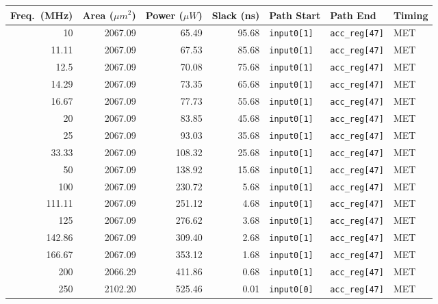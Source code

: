 \documentclass[a4paper,11pt]{article}
\begin{document}
\begin{table}[H]
    \centering
    \scriptsize
    \begin{tabular}{rrrrlll}
        \toprule
        \textbf{Freq.\ (MHz)} &
        \textbf{Area ($\mu m^2$)} &
        \textbf{Power ($\mu W$)} &
        \textbf{Slack (ns)} &
        \textbf{Path Start} &
        \textbf{Path End} &
        \textbf{Timing} \\
        \midrule
        10      & 2067.09 & 65.49   & 95.68  & \texttt{input0[1]}  & \texttt{acc\_reg[47]} & MET \\
        11.11   & 2067.09 & 67.53   & 85.68  & \texttt{input0[1]}  & \texttt{acc\_reg[47]} & MET \\
        12.5    & 2067.09 & 70.08   & 75.68  & \texttt{input0[1]}  & \texttt{acc\_reg[47]} & MET \\
        14.29   & 2067.09 & 73.35   & 65.68  & \texttt{input0[1]}  & \texttt{acc\_reg[47]} & MET \\
        16.67   & 2067.09 & 77.73   & 55.68  & \texttt{input0[1]}  & \texttt{acc\_reg[47]} & MET \\
        20      & 2067.09 & 83.85   & 45.68  & \texttt{input0[1]}  & \texttt{acc\_reg[47]} & MET \\
        25      & 2067.09 & 93.03   & 35.68  & \texttt{input0[1]}  & \texttt{acc\_reg[47]} & MET \\
        33.33   & 2067.09 & 108.32  & 25.68  & \texttt{input0[1]}  & \texttt{acc\_reg[47]} & MET \\
        50      & 2067.09 & 138.92  & 15.68  & \texttt{input0[1]}  & \texttt{acc\_reg[47]} & MET \\
        100     & 2067.09 & 230.72  & 5.68   & \texttt{input0[1]}  & \texttt{acc\_reg[47]} & MET \\
        111.11  & 2067.09 & 251.12  & 4.68   & \texttt{input0[1]}  & \texttt{acc\_reg[47]} & MET \\
        125     & 2067.09 & 276.62  & 3.68   & \texttt{input0[1]}  & \texttt{acc\_reg[47]} & MET \\
        142.86  & 2067.09 & 309.40  & 2.68   & \texttt{input0[1]}  & \texttt{acc\_reg[47]} & MET \\
        166.67  & 2067.09 & 353.12  & 1.68   & \texttt{input0[1]}  & \texttt{acc\_reg[47]} & MET \\
        200     & 2066.29 & 411.86  & 0.68   & \texttt{input0[1]}  & \texttt{acc\_reg[47]} & MET \\
        250     & 2102.20 & 525.46  & 0.01   & \texttt{input0[0]}  & \texttt{acc\_reg[47]} & MET \\

\end{tabular}
\end{table}
\end{document}
